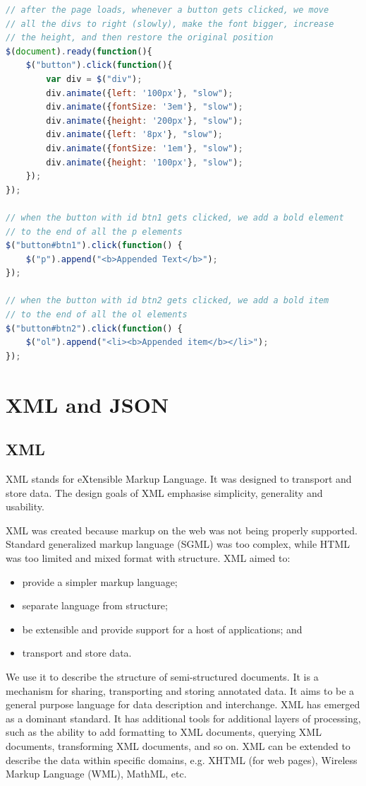 \documentclass[a4paper, openany]{memoir}
\begin{document}
\begin{lstlisting}[language=javascript]
// after the page loads, whenever a button gets clicked, we move
// all the divs to right (slowly), make the font bigger, increase 
// the height, and then restore the original position
$(document).ready(function(){	
	$("button").click(function(){	
		var	div	= $("div");			
		div.animate({left: '100px'}, "slow");	
		div.animate({fontSize: '3em'}, "slow");	
		div.animate({height: '200px'}, "slow");	
		div.animate({left: '8px'}, "slow");	
		div.animate({fontSize: '1em'}, "slow");	
        div.animate({height: '100px'}, "slow");
    });	
});

// when the button with id btn1 gets clicked, we add a bold element
// to the end of all the p elements
$("button#btn1").click(function() {
    $("p").append("<b>Appended Text</b>");
});

// when the button with id btn2 gets clicked, we add a bold item
// to the end of all the ol elements
$("button#btn2").click(function() {
    $("ol").append("<li><b>Appended item</b></li>");
});
\end{lstlisting}
\newpage

\section{XML and JSON}
\subsection{XML}
XML stands for eXtensible Markup Language. It was designed to transport and store data. The design goals of XML emphasise simplicity, generality and usability.

XML was created because markup on the web was not being properly supported. Standard generalized markup language (SGML) was too complex, while HTML was too limited and mixed format with structure. XML aimed to:
\begin{itemize}
    \item provide a simpler markup language;
    \item separate language from structure;
    \item be extensible and provide support for a host of applications; and
    \item transport and store data.
\end{itemize}
We use it to describe the structure of semi-structured documents. It is a mechanism for sharing, transporting and storing annotated data. It aims to be a general purpose language for data description and interchange. XML has emerged as a dominant standard. It has additional tools for additional layers of processing, such as the ability to add formatting to XML documents, querying XML documents, transforming XML documents, and so on. XML can be extended to describe the data within specific domains, e.g. XHTML (for web pages), Wireless Markup Language (WML), MathML, etc.
\end{document}
